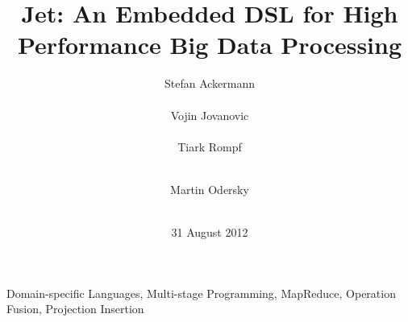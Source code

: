 \documentclass{acm_proc_article-sp}
\newcommand{\tool}{Jet\xspace}
\begin{document}

    
  \title{\tool: An Embedded DSL for High Performance Big Data Processing}


  \author{
	\alignauthor
	Stefan Ackermann\\
	 \\
        \alignauthor
        Vojin Jovanovic\\
        \\
        \alignauthor
        Tiark Rompf\\
        \\
\and
       \alignauthor
        Martin Odersky\\
        \\
  }
  
  
  
  
  \date{31 August 2012}
  \maketitle
  
  \begin{abstract}
    
  \end{abstract}
  \keywords Domain-specific Languages, Multi-stage Programming, MapReduce,
  Operation Fusion, Projection Insertion


  
  
  
  
  
  
  
  
  
  

  
  
  
  
\end{document}
